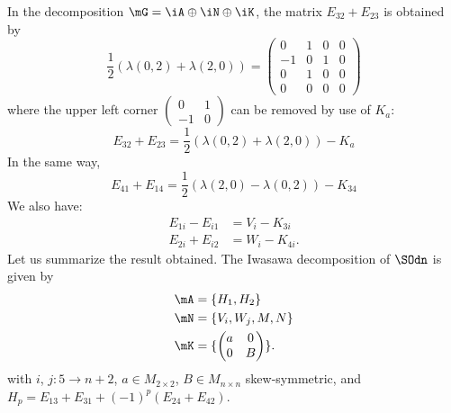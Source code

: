 In the decomposition $\mG=\iA\oplus\iN\oplus\iK$, the matrix $E_{32}+E_{23}$ is obtained by
\[
	\frac{1}{2}(\lambda(0,2)+\lambda(2,0))=\begin{pmatrix}
		0  & 1 & 0 & 0 \\
		-1 & 0 & 1 & 0 \\
		0  & 1 & 0 & 0 \\
		0  & 0 & 0 & 0
	\end{pmatrix}
\]
where the upper left corner $\begin{pmatrix}0&1\\-1&0\end{pmatrix}$ can be removed by use of $K_a$:
\[
	E_{32}+E_{23}=\frac{1}{2}(\lambda(0,2)+\lambda(2,0))-K_a
\]
In the same way,
\[
	E_{41}+E_{14}=\frac{1}{2}(\lambda(2,0)-\lambda(0,2))-K_{34}
\]
We also have:
\begin{equation}
	\begin{split}
		E_{1i}-E_{i1}&=V_i-K_{3i}\\
		E_{2i}+E_{i2}&=W_i-K_{4i}.
	\end{split}
\end{equation}
Let us summarize the result obtained.  The Iwasawa decomposition of $\SOdn$ is given by
\begin{subequations}\label{eq:Iwasawa_explicite}
	\begin{align}
		\mA & =\{H_1,H_2\}                               \\
		\mN & =\{V_i,W_j,M,N\}                           \\
		\mK & =\{\begin{pmatrix}a&0\\0&B\end{pmatrix}\}.
	\end{align}
\end{subequations}
with $i$, $j:5\to n+2$, $a\in M_{2\times 2}$, $B\in M_{n\times n}$ skew-symmetric, and
$H_p=E_{13}+E_{31}+(-1)^p(E_{24}+E_{42})$.

